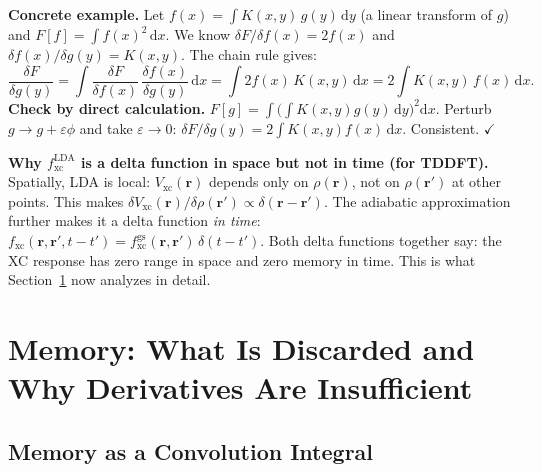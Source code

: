 \documentclass[12pt,letterpaper]{article}
\newcommand{\dd}{\mathrm{d}}
\newcommand{\Vxc}{V_{\mathrm{xc}}}
\newcommand{\fxc}{f_{\mathrm{xc}}}
\theoremstyle{definition}
\begin{document}
\textbf{Concrete example.}
Let $f(x) = \int K(x,y)\,g(y)\,\dd y$ (a linear transform of $g$) and
$F[f] = \int f(x)^2\,\dd x$.
We know $\delta F/\delta f(x) = 2f(x)$ and
$\delta f(x)/\delta g(y) = K(x,y)$.
The chain rule gives:
\begin{equation}
  \frac{\delta F}{\delta g(y)}
  = \int \frac{\delta F}{\delta f(x)}\,\frac{\delta f(x)}{\delta g(y)}\,\dd x
  = \int 2f(x)\,K(x,y)\,\dd x
  = 2\int K(x,y)\,f(x)\,\dd x.
  \label{eq:chain_rule_example}
\end{equation}
\textbf{Check by direct calculation.}
$F[g] = \int\!\bigl(\int K(x,y)g(y)\,\dd y\bigr)^2\!\dd x$.
Perturb $g\to g+\varepsilon\phi$ and take $\varepsilon\to 0$:
$\delta F/\delta g(y) = 2\int K(x,y)f(x)\,\dd x$. Consistent. $\checkmark$

\begin{insight}
\textbf{Why $\fxc^{\mathrm{LDA}}$ is a delta function in space but not in time
(for TDDFT).}
Spatially, LDA is local: $\Vxc(\bm{r})$ depends only on $\rho(\bm{r})$,
not on $\rho(\bm{r}')$ at other points.
This makes $\delta\Vxc(\bm{r})/\delta\rho(\bm{r}') \propto \delta(\bm{r}-\bm{r}')$.
The adiabatic approximation further makes it a delta function \emph{in time}:
$\fxc(\bm{r},\bm{r}',t-t') = \fxc^{\mathrm{gs}}(\bm{r},\bm{r}')\,\delta(t-t')$.
Both delta functions together say:
the XC response has zero range in space and zero memory in time.
This is what Section~\ref{sec:memory} now analyzes in detail.
\end{insight}

\section{Memory: What Is Discarded and Why Derivatives Are Insufficient}
\label{sec:memory}

\subsection{Memory as a Convolution Integral}
\end{document}
